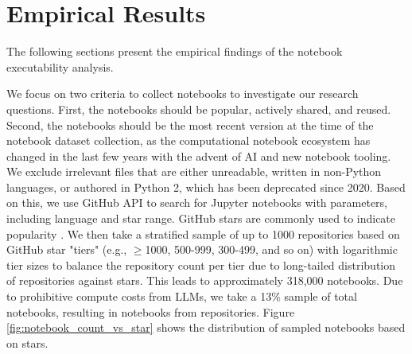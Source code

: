 \section{Empirical Results}
The following sections present the empirical findings of the notebook executability analysis.


     We focus on two criteria to collect notebooks to investigate our research questions. First, the notebooks should be popular, actively shared, and reused. Second, the notebooks should be the most recent version at the time of the notebook dataset collection, as the computational notebook ecosystem has changed in the last few years with the advent of AI and new notebook tooling. We exclude irrelevant files that are either unreadable, written in non-Python languages, or authored in Python 2, which has been deprecated since 2020. Based on this, we use GitHub API to search for Jupyter notebooks with parameters, including language and star range. 
    GitHub stars are commonly used to indicate popularity \cite{Borges2016}.  We then take a stratified sample of up to 1000 repositories based on GitHub star "tiers" (e.g., $\geq$1000, 500-999, 300-499, and so on) with logarithmic tier sizes to balance the repository count per tier due to long-tailed distribution of repositories against stars. This leads to approximately 318,000 notebooks. Due to prohibitive compute costs from LLMs, we take a 13\%  sample of total notebooks,  resulting in \totalNotebooksInDataset notebooks from \totalRepos repositories.    Figure \ref{fig:notebook_count_vs_star} shows the distribution of sampled notebooks based on stars.



    

